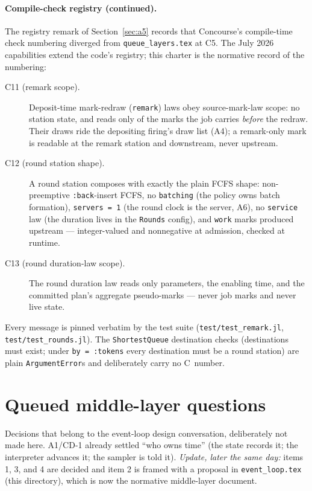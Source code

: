 \documentclass[11pt]{article}
\newcommand{\code}[1]{\texttt{#1}}
\begin{document}
\paragraph{Compile-check registry (continued).} The registry remark of
Section~\ref{sec:a5} records that Concourse's compile-time check numbering
diverged from \code{queue\_layers.tex} at C5. The July 2026 capabilities
extend the code's registry; this charter is the normative record of the
numbering:

\begin{description}
\item[C11 (remark scope).] Deposit-time mark-redraw (\code{remark}) laws
  obey source-mark-law scope: no station state, and reads only of the
  marks the job carries \emph{before} the redraw. Their draws ride the
  depositing firing's draw list (A4); a remark-only mark is readable at
  the remark station and downstream, never upstream.
\item[C12 (round station shape).] A round station composes with exactly
  the plain FCFS shape: non-preemptive \code{:back}-insert FCFS, no
  \code{batching} (the policy owns batch formation), \code{servers = 1}
  (the round clock is the server, A6), no \code{service} law (the
  duration lives in the \code{Rounds} config), and \code{work} marks
  produced upstream --- integer-valued and nonnegative at admission,
  checked at runtime.
\item[C13 (round duration-law scope).] The round duration law reads only
  parameters, the enabling time, and the committed plan's aggregate
  pseudo-marks --- never job marks and never live state.
\end{description}

Every message is pinned verbatim by the test suite
(\code{test/test\_remark.jl}, \code{test/test\_rounds.jl}). The
\code{ShortestQueue} destination checks (destinations must exist; under
\code{by = :tokens} every destination must be a round station) are plain
\code{ArgumentError}s and deliberately carry no C~number.

\section{Queued middle-layer questions}
\label{sec:queued}

Decisions that belong to the event-loop design conversation, deliberately
not made here. A1/CD-1 already settled ``who owns time'' (the state records
it; the interpreter advances it; the sampler is told it).
\emph{Update, later the same day:} items 1, 3, and 4 are decided and item 2
is framed with a proposal in \code{event\_loop.tex} (this directory), which
is now the normative middle-layer document.
\end{document}
